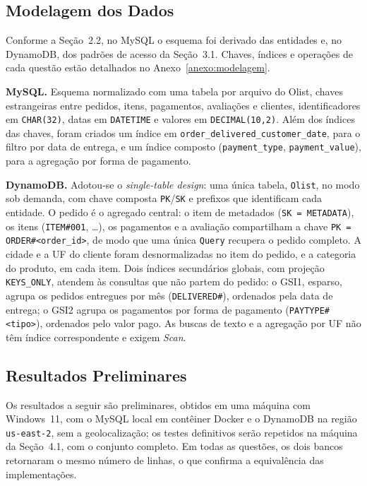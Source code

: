 \documentclass[12pt]{article}
\begin{document}
\subsection{Modelagem dos Dados}

Conforme a Seção~2.2, no MySQL o esquema foi derivado das entidades e, no
DynamoDB, dos padrões de acesso da Seção~3.1. Chaves, índices e operações de
cada questão estão detalhados no Anexo~\ref{anexo:modelagem}.

\textbf{MySQL.} Esquema normalizado com uma tabela por arquivo do Olist, chaves
estrangeiras entre pedidos, itens, pagamentos, avaliações e clientes,
identificadores em \texttt{CHAR(32)}, datas em \texttt{DATETIME} e valores em
\texttt{DECIMAL(10,2)}. Além dos índices das chaves, foram criados um índice em
\texttt{order\_delivered\_customer\_date}, para o filtro por data de entrega, e
um índice composto (\texttt{payment\_type}, \texttt{payment\_value}), para a
agregação por forma de pagamento.

\textbf{DynamoDB.} Adotou-se o \textit{single-table design}: uma única tabela,
\texttt{Olist}, no modo sob demanda, com chave composta \texttt{PK}/\texttt{SK}
e prefixos que identificam cada entidade. O pedido é o agregado central: o
item de metadados (\texttt{SK = METADATA}), os itens (\texttt{ITEM\#001},
\ldots), os pagamentos e a avaliação compartilham a chave
\texttt{PK = ORDER\#<order\_id>}, de modo que uma única \texttt{Query}
recupera o pedido completo. A cidade e a UF do cliente foram desnormalizadas no
item do pedido, e a categoria do produto, em cada item. Dois índices
secundários globais, com projeção \texttt{KEYS\_ONLY}, atendem às consultas que
não partem do pedido: o GSI1, esparso, agrupa os pedidos entregues por mês
(\texttt{DELIVERED\#<AAAA-MM>}), ordenados pela data de entrega; o GSI2 agrupa
os pagamentos por forma de pagamento (\texttt{PAYTYPE\#<tipo>}), ordenados pelo
valor pago. As buscas de texto e a agregação por UF não têm índice
correspondente e exigem \textit{Scan}.

\subsection{Resultados Preliminares}

Os resultados a seguir são preliminares, obtidos em uma máquina com
Windows~11, com o MySQL local em contêiner Docker e o DynamoDB na região
\texttt{us-east-2}, sem a geolocalização; os testes definitivos serão
repetidos na máquina da Seção~4.1, com o conjunto completo. Em todas as
questões, os dois bancos retornaram o mesmo número de linhas, o que confirma a
equivalência das implementações.
\end{document}
